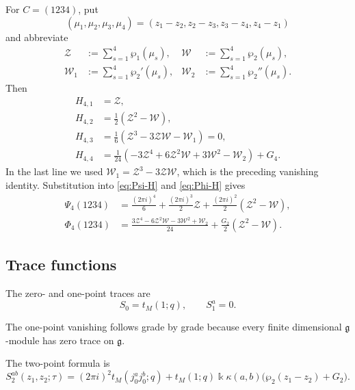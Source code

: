 \documentclass[11pt,a4paper]{amsart}
\numberwithin{equation}{section}
\theoremstyle{definition}
\theoremstyle{remark}
\newcommand{\g}{\mathfrak g}
\newcommand{\kk}{\Bbbk}
\newcommand{\ii}{i}
\begin{document}
For $C=(1234)$, put
\begin{equation*}
 (\mu_1,\mu_2,\mu_3,\mu_4)
 =(z_1-z_2,z_2-z_3,z_3-z_4,z_4-z_1)
\end{equation*}
and abbreviate
\begin{align*}
 \mathcal Z&:=\sum_{s=1}^4\wp_1(\mu_s),&
 \mathcal W&:=\sum_{s=1}^4\wp_2(\mu_s),\\
 \mathcal W_1&:=\sum_{s=1}^4\wp_2'(\mu_s),&
 \mathcal W_2&:=\sum_{s=1}^4\wp_2''(\mu_s).
\end{align*}
Then
\begin{align*}
 H_{4,1}&=\mathcal Z,\\
 H_{4,2}&=\frac12(\mathcal Z^2-\mathcal W),\\
 H_{4,3}&=\frac16
 (\mathcal Z^3-3\mathcal Z\mathcal W-\mathcal W_1)=0,\\
 H_{4,4}&=\frac1{24}\left(
 -3\mathcal Z^4+6\mathcal Z^2\mathcal W
 +3\mathcal W^2-\mathcal W_2\right)+G_4.
\end{align*}
In the last line we used
$\mathcal W_1=\mathcal Z^3-3\mathcal Z\mathcal W$, which is the preceding
vanishing identity.  Substitution into \eqref{eq:Psi-H} and
\eqref{eq:Phi-H} gives
\begin{align}
 \Psi_4(1234)
 &=\frac{(2\pi\ii)^4}{6}
 +\frac{(2\pi\ii)^3}{2}\mathcal Z
 +\frac{(2\pi\ii)^2}{2}(\mathcal Z^2-\mathcal W),
 \label{eq:Psi4}\\
 \Phi_4(1234)
 &=\frac{
 3\mathcal Z^4-6\mathcal Z^2\mathcal W
 -3\mathcal W^2+\mathcal W_2}{24}
 +\frac{G_2}{2}(\mathcal Z^2-\mathcal W).
 \label{eq:Phi4}
\end{align}

\subsection{Trace functions}

The zero- and one-point traces are
\begin{equation*}
 S_0=t_M(1;q),\qquad S_1^a=0.
\end{equation*}

The one-point vanishing follows grade by grade because every finite
dimensional $\g$-module has zero trace on $\g$.

The two-point formula is
\begin{equation}
 S_2^{ab}(z_1,z_2;\tau)
 =(2\pi\ii)^2t_M(j_0^aj_0^b;q)
 +t_M(1;q)\kk\kappa(a,b)
 \bigl(\wp_2(z_1-z_2)+G_2\bigr).
 \label{eq:S2-explicit}
\end{equation}
\end{document}
